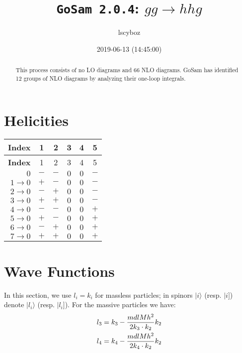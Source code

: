\documentclass[a4paper]{article}
\title{\texttt{GoSam 2.0.4}: ${g}{g}\rightarrow{h}{h}{g}$}
\author{lscyboz}
\date{2019-06-13 (14:45:00)}
\newcommand{\kea}[1]{\vert #1 \rangle}
\newcommand{\keb}[1]{\vert #1 ]}
\begin{document}
\maketitle
\begin{abstract}
\noindent This process consists of no LO diagrams and 66 NLO diagrams. GoSam has identified 12 groups  of NLO diagrams by analyzing their one-loop integrals.
\end{abstract}
\newpage
\tableofcontents
\newpage

\section{Helicities}

\begin{longtable}[c]{r|ccccc}
\bf{Index} &1&2&3&4&5\\
\hline
\endfirsthead
\bf{Index} &1&2&3&4&5\\
\hline
\endhead 
$0$& $-$& $-$& $0$& $0$& $-$\\
$1\rightarrow 0$& $+$& $-$& $0$& $0$& $-$\\
$2\rightarrow 0$& $-$& $+$& $0$& $0$& $-$\\
$3\rightarrow 0$& $+$& $+$& $0$& $0$& $-$\\
$4\rightarrow 0$& $-$& $-$& $0$& $0$& $+$\\
$5\rightarrow 0$& $+$& $-$& $0$& $0$& $+$\\
$6\rightarrow 0$& $-$& $+$& $0$& $0$& $+$\\
$7\rightarrow 0$& $+$& $+$& $0$& $0$& $+$\\
\end{longtable}
\section{Wave Functions}
In this section, we use $l_i=k_i$ for massless particles;
in spinors $\kea{i}$ (resp. $\keb{i}$) denote $\kea{l_i}$ (resp. $\keb{l_i}$).
For the massive particles we have:
\begin{align}
l_{3} &= k_{3} - \frac{mdlMh^2}{%
      2 k_{3}\cdot k_{2}}k_{2}\\
l_{4} &= k_{4} - \frac{mdlMh^2}{%
      2 k_{4}\cdot k_{2}}k_{2}
\end{align}
\end{document}
